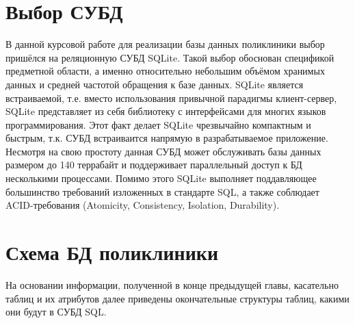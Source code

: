 \documentclass[14pt,a4paper,russian]{extreport}
\begin{document}
\section{Выбор СУБД}
В данной курсовой работе для реализации базы данных поликлиники выбор пришёлся на реляционную СУБД
SQLite. Такой выбор обоснован спецификой предметной области, а именно относительно небольшим
объёмом хранимых данных и средней частотой обращения к базе данных. SQLite является
встраиваемой, т.е. вместо использования привычной парадигмы клиент-сервер, SQLite представляет из
себя библиотеку с интерфейсами для многих языков программирования. Этот факт делает SQLite
чрезвычайно компактным и быстрым, т.к. СУБД встраиваится напрямую в разрабатываемое приложение.
Несмотря на свою простоту данная СУБД может обслуживать базы данных размером до 140 террабайт и
поддерживает параллельный доступ к БД несколькими процессами. Помимо этого SQLite выполняет
поддавляющее большинство требований изложенных в стандарте SQL, а также соблюдает ACID-требования
(Atomicity, Consistency, Isolation, Durability).\cite{sqlite}


\section{Схема БД поликлиники}
На основании информации, полученной в конце предыдущей главы, касательно таблиц и их атрибутов
далее приведены окончательные структуры таблиц, какими они будут в СУБД SQL.

{}
\end{document}
